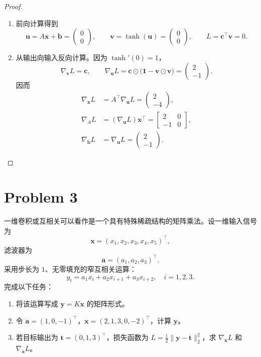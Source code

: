 \begin{proof}
    \begin{enumerate}
        \item 前向计算得到
        \[
            \bm{u}=A\bm{x}+\bm{b}
            =\begin{pmatrix}0\\0\end{pmatrix},\qquad
            \bm{v}=\tanh(\bm{u})
            =\begin{pmatrix}0\\0\end{pmatrix},\qquad
            L=\bm{c}^\top\bm{v}=\boxed{0}.
        \]
        \item 从输出向输入反向计算。因为 $\tanh'(0)=1$，
        \[
            \nabla_{\bm{v}}L=\bm{c},\qquad
            \nabla_{\bm{u}}L
            =\bm{c}\odot\bigl(\bm{1}-\bm{v}\odot\bm{v}\bigr)
            =\begin{pmatrix}2\\-1\end{pmatrix}.
        \]
        因而
        \[
        \begin{aligned}
            \nabla_{\bm{x}}L
            &=A^\top\nabla_{\bm{u}}L
             =\boxed{\begin{pmatrix}2\\-4\end{pmatrix}},\\
            \nabla_AL
            &=(\nabla_{\bm{u}}L)\bm{x}^\top
             =\boxed{\begin{bmatrix}2&0\\-1&0\end{bmatrix}},\\
            \nabla_{\bm{b}}L
            &=\nabla_{\bm{u}}L
             =\boxed{\begin{pmatrix}2\\-1\end{pmatrix}}.
        \end{aligned}
        \]
    \end{enumerate}
\end{proof}

\section*{Problem 3}

一维卷积或互相关可以看作是一个具有特殊稀疏结构的矩阵乘法。设一维输入信号为
\[
\bm{x} = (x_1, x_2, x_3, x_4, x_5)^\top,
\]
滤波器为
\[
\bm{a} = (a_1, a_2, a_3)^\top.
\]
采用步长为 $1$、无零填充的窄互相关运算：
\[
y_i = a_1 x_i + a_2 x_{i+1} + a_3 x_{i+2},\quad i = 1, 2, 3.
\]
完成以下任务：
\begin{enumerate}
    \item 将该运算写成 $\bm{y} = K \bm{x}$ 的矩阵形式。
    \item 令 $\bm{a} = (1, 0, -1)^\top$，$\bm{x} = (2, 1, 3, 0, -2)^\top$，计算 $\bm{y}$。
    \item 若目标输出为 $\bm{t} = (0, 1, 3)^\top$，损失函数为 $L = \frac{1}{2} \|\bm{y} - \bm{t}\|_2^2$，求 $\nabla_{\bm{x}} L$ 和 $\nabla_{\bm{a}} L$。
\end{enumerate}

